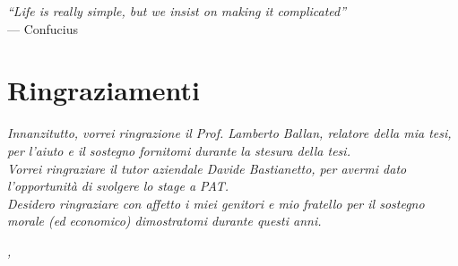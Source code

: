 
\cleardoublepage
{}
{}
\begin{flushright}{
	\slshape    
	``Life is really simple, but we insist on making it complicated''} \\ 
	\medskip
    --- Confucius
\end{flushright}


\bigskip

\begingroup
\let\clearpage\relax
\let\cleardoublepage\relax
\let\cleardoublepage\relax

\chapter*{Ringraziamenti}

\noindent \textit{Innanzitutto, vorrei ringrazione il Prof. Lamberto Ballan, relatore della mia tesi, per l'aiuto e il sostegno fornitomi durante la stesura della tesi.}\\
\noindent \textit{Vorrei ringraziare il tutor aziendale Davide Bastianetto, per avermi dato l'opportunità di svolgere lo stage a PAT.}\\
\noindent \textit{Desidero ringraziare con affetto i miei genitori e mio fratello per il sostegno morale (ed economico) dimostratomi durante questi anni.}\\

\bigskip

\noindent\textit{\myLocation, \myTime}
\hfill \myName

\endgroup

